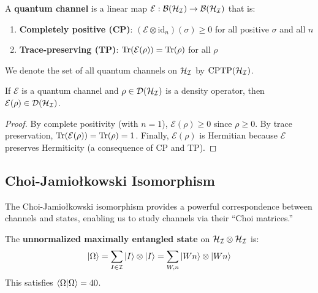 \begin{definition}
\label{def:quantum-channel}
A \textbf{quantum channel} is a linear map $\mathcal{E} : \mathcal{B}(\mathcal{H}_{\mathcal{I}}) \to \mathcal{B}(\mathcal{H}_{\mathcal{I}})$ that is:
\begin{enumerate}
  \item \textbf{Completely positive (CP)}: $(\mathcal{E} \otimes \mathrm{id}_n)(\sigma) \geq 0$ for all positive $\sigma$ and all $n$
  \item \textbf{Trace-preserving (TP)}: $\mathrm{Tr}(\mathcal{E}(\rho)) = \mathrm{Tr}(\rho)$ for all $\rho$
\end{enumerate}
We denote the set of all quantum channels on $\mathcal{H}_{\mathcal{I}}$ by $\mathrm{CPTP}(\mathcal{H}_{\mathcal{I}})$.
\end{definition}

\begin{proposition}
\label{prop:channel-preserves-density}
If $\mathcal{E}$ is a quantum channel and $\rho \in \mathcal{D}(\mathcal{H}_{\mathcal{I}})$ is a density operator, then $\mathcal{E}(\rho) \in \mathcal{D}(\mathcal{H}_{\mathcal{I}})$.
\end{proposition}

\begin{proof}
By complete positivity (with $n=1$), $\mathcal{E}(\rho) \geq 0$ since $\rho \geq 0$. By trace preservation, $\mathrm{Tr}(\mathcal{E}(\rho)) = \mathrm{Tr}(\rho) = 1$. Finally, $\mathcal{E}(\rho)$ is Hermitian because $\mathcal{E}$ preserves Hermiticity (a consequence of CP and TP).
\end{proof}

\subsection{Choi-Jamio\l{}kowski Isomorphism}

The Choi-Jamio\l{}kowski isomorphism provides a powerful correspondence between channels and states, enabling us to study channels via their ``Choi matrices.''

\begin{definition}
\label{def:max-entangled-channel}
The \textbf{unnormalized maximally entangled state} on $\mathcal{H}_{\mathcal{I}} \otimes \mathcal{H}_{\mathcal{I}}$ is:
\[
|\Omega\rangle = \sum_{I \in \mathcal{I}} |I\rangle \otimes |I\rangle = \sum_{W,n} |Wn\rangle \otimes |Wn\rangle
\]
This satisfies $\langle \Omega|\Omega\rangle = 40$.
\end{definition}

